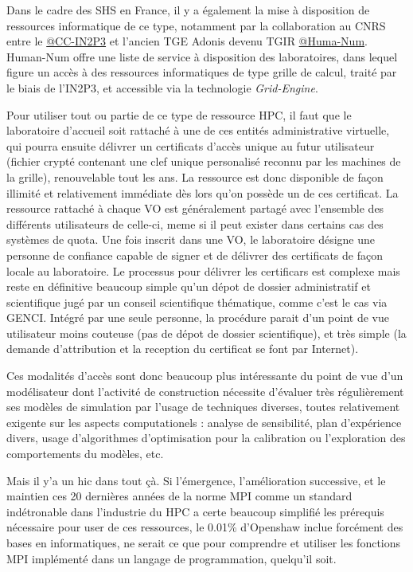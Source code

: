 Dans le cadre des SHS en France, il y a également la mise à disposition de ressources informatique de ce type, notamment par la collaboration au CNRS entre le \href{http://cc.in2p3.fr/}{@CC-IN2P3} et l'ancien TGE Adonis devenu TGIR \href{http://www.huma-num.fr/}{@Huma-Num}. Human-Num offre une liste de service à disposition des laboratoires, dans lequel figure un accès à des ressources informatiques de type grille de calcul, traité par le biais de l'IN2P3, et accessible via la technologie \textit{Grid-Engine}.

Pour utiliser tout ou partie de ce type de ressource HPC, il faut que le laboratoire d'accueil soit rattaché à une de ces entités administrative virtuelle, qui pourra ensuite délivrer un certificats d'accès unique au futur utilisateur (fichier crypté contenant une clef unique personalisé reconnu par les machines de la grille), renouvelable tout les ans. La ressource est donc disponible de façon illimité et relativement immédiate dès lors qu'on possède un de ces certificat. La ressource rattaché à chaque VO est généralement partagé avec l'ensemble des différents utilisateurs de celle-ci, meme si il peut exister dans certains cas des systèmes de quota. Une fois inscrit dans une VO, le laboratoire désigne une personne de confiance capable de signer et de délivrer des certificats de façon locale au laboratoire. Le processus pour délivrer les certificars est complexe mais reste en définitive beaucoup simple qu'un dépot de dossier administratif et scientifique jugé par un conseil scientifique thématique, comme c'est le cas via GENCI. Intégré par une seule personne, la procédure parait d'un point de vue utilisateur moins couteuse (pas de dépot de dossier scientifique), et très simple (la demande d'attribution et la reception du certificat se font par Internet).

Ces modalités d'accès sont donc beaucoup plus intéressante du point de vue d'un modélisateur dont l'activité de construction nécessite d'évaluer très régulièrement ses modèles de simulation par l'usage de techniques diverses, toutes relativement exigente sur les aspects computationels : analyse de sensibilité, plan d'expérience divers, usage d'algorithmes d'optimisation pour la calibration ou l'exploration des comportements du modèles, etc.

Mais il y'a un hic dans tout çà. Si l'émergence, l'amélioration successive, et le maintien ces 20 dernières années de la norme MPI comme un standard indétronable dans l'industrie du HPC a certe beaucoup simplifié les prérequis nécessaire pour user de ces ressources, le 0.01\% d'Openshaw inclue forcément des bases en informatiques, ne serait ce que pour comprendre et utiliser les fonctions MPI implémenté dans un langage de programmation, quelqu'il soit.

